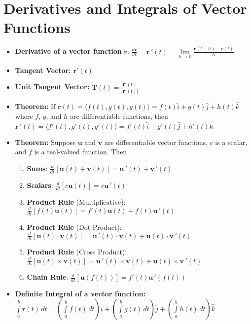 \documentclass{report}
\begin{document}
	\section{Derivatives and Integrals of Vector Functions}
		\begin{itemize}\addtolength{\leftskip}{2em}
			\item \textbf{Derivative of a vector function} $\mathbf{r}$:
				\subitem \huge$\frac{d\mathbf{r}}{dt}=\mathbf{r}\,'(t)=\lim\limits_{h\rightarrow 0}\frac{\mathbf{r}(t+h)-\mathbf{r}(t)}{h}$
			\large\item \textbf{Tangent Vector:} $\mathbf{r}'(t)$
			\item \textbf{Unit Tangent Vector:}
				\subitem\Large $\mathbf{T}(t)=\frac{\mathbf{r}'(t)}{|\mathbf{r}'(t)|}$
			\large\item \textbf{Theorem:} If $\mathbf{r}(t)=\langle f(t),g(t),g(t) \rangle=f(t)\hat{i}+g(t)\hat{j}+h(t)\hat{k}$ where $f$, $g$, and $h$ are differentiable functions, then
				\subitem\Large $\mathbf{r}\,'(t)=\langle f'(t),g'(t),g'(t) \rangle=f'(t)\hat{i}+g'(t)\hat{j}+h'(t)\hat{k}$
			\large \item \textbf{Theorem:} Suppose $\mathbf{u}$ and $\mathbf{v}$ are differentiable vector functions, $c$ is a scalar, and $f$ is a real-valued function. Then
				\begin{enumerate}\addtolength{\leftskip}{4em}
					\large \item \textbf{Sums}: \Large$\frac{d}{dt}[\mathbf{u}(t)+\mathbf{v}(t)]=\mathbf{u}\,'(t)+\mathbf{v}\,'(t)$
					\large \item \textbf{Scalars}: \Large$\frac{d}{dt}[c\mathbf{u}(t)]=c\mathbf{u}\,'(t)$
					\large \item \textbf{Product Rule} (Multiplicative): \Large$\frac{d}{dt}[f(t)\mathbf{u}(t)]=f'(t)\mathbf{u}(t)+f(t)\mathbf{u}\,'(t)$
					\large \item \textbf{Product Rule} (Dot Product): \Large$\frac{d}{dt}[\mathbf{u}(t)\cdot \mathbf{v}(t)]=\mathbf{u}\,'(t)\cdot \mathbf{v}(t)+\mathbf{u}(t)\cdot \mathbf{v}\,'(t)$
					\large \item \textbf{Product Rule} (Cross Product): \Large$\frac{d}{dt}[\mathbf{u}(t)\times \mathbf{v}(t)]=\mathbf{u}\,'(t)\times \mathbf{v}(t)+\mathbf{u}(t)\times \mathbf{v}\,'(t)$
					\large \item \textbf{Chain Rule}: \Large$\frac{d}{dt}[\mathbf{u}(f(t))]=f'(t)\mathbf{u}\,'(f(t))$
				\end{enumerate}
				\item \textbf{Definite Integral of a vector function:} 
				\subitem $\int\limits_{a}^{b}\textbf{r}(t)\,dt=(\int\limits_{a}^{b}f(t)\,dt)\hat{i}+(\int\limits_{a}^{b}g(t)\,dt)\hat{j}+(\int\limits_{a}^{b}h(t)\,dt)\hat{k}$
		\end{itemize}
\end{document}
